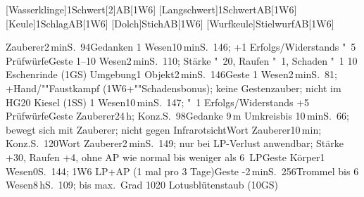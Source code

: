 \documentclass{m5figur-mv}[2015/01/02]
\begin{document}
{[Wasserklinge]{1Schwert}[2]{AB}[1W6]
[Langschwert]{1Schwert}{AB}[1W6]
[Keule]{1Schlag}{AB}[1W6]
[Dolch]{Stich}{AB}[1W6]
[Wurfkeule]{Stielwurf}{AB}[1W6]

{ %




%
  {Zauberer}{2\,min}{S.~94}{Gedanken}
%
  {1 Wesen}{10\,min}{S.~146; +1 Erfolgs/Widerstands "~5 Prüfwürfe}{Geste}
%
  {1--10 Wesen}{2\,min}{S.~110; Stärke "~20, Raufen "~1, Schaden "~1}%
  {10 Eschenrinde (1GS)}
%
  {Umgebung}{1 Objekt}{2\,min}{S.~146}{Geste}
%
  {1 Wesen}{2\,min}{S.~81; +Hand/""Faustkampf (1W6+""Schadensbonus);
  keine Gestenzauber; nicht im HG}{20 Kiesel (1SS)}
%
  {1 Wesen}{10\,min}{S.~147; "~1 Erfolgs/Widerstands +5 Prüfwürfe}{Geste}
%
  {Zauberer}{24\,h; Konz.}{S.~98}{Gedanke}
%
  {9\,m Umkreis}{bis 10\,min}{S.~66; bewegt sich mit Zauberer;
  nicht gegen Infrarotsicht}{Wort}
%
  {Zauberer}{10\,min; Konz.}{S.~120}{Wort}
%
  {Zauberer}{2\,min}{S.~149; nur bei LP-Verlust anwendbar;
  Stärke +30, Raufen +4, ohne AP wie normal bis weniger als 6~LP}{Geste}
%
  {Körper}{1 Wesen}{0}{S.~144; 1W6 LP+AP (1 mal pro 3 Tage)}{Geste}
%
  {-}{2\,min}{S.~256}{Trommel}
%
  {bis 6 Wesen}{8\,h}{S.~109; bis max.\ Grad 10}{20 Lotusblütenstaub (10GS)}


}}
\end{document}
